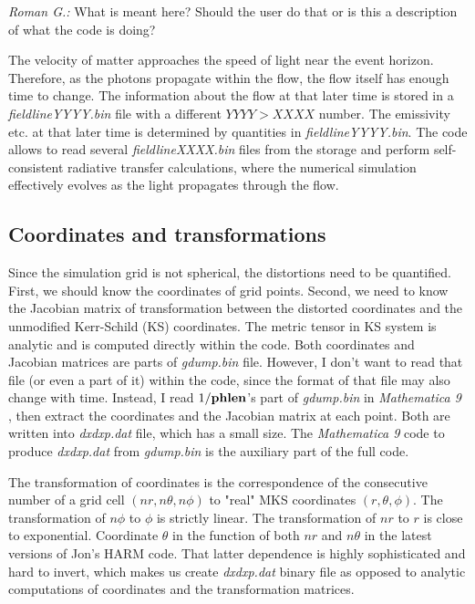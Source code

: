 \documentclass{emulateapj}
\newcommand{\mat}{\textit{Mathematica 9 }}
\newcommand{\rg}[1]{\color{blue}\textit{Roman G.:} #1\color{black}}
\begin{document}
\rg{What is meant here? Should the user do that or is this a
  description of what the code is doing?}

The velocity of matter approaches the speed of light near the event
horizon. Therefore, as the photons propagate within the flow, the flow
itself has enough time to change.  The information about the flow at
that later time is stored in a \textit{fieldlineYYYY.bin} file with a
different $YYYY>XXXX$ number. The emissivity etc.  at that later time
is determined by quantities in \textit{fieldlineYYYY.bin}. The code
allows to read several \textit{fieldlineXXXX.bin} files from the
storage and perform self-consistent radiative transfer calculations,
where the numerical simulation effectively evolves as the light
propagates through the flow.

\subsection{Coordinates and transformations}
Since the simulation grid is not spherical, the distortions need to be quantified.
First, we should know the coordinates of grid points. Second, we need to know the Jacobian matrix of transformation between the distorted coordinates and
the unmodified Kerr-Schild (KS) coordinates. The metric tensor in KS system is analytic and is computed directly within the code.
Both coordinates and Jacobian matrices are parts of \textit{gdump.bin} file. However, I don't want to read that file (or even a part of it) within the code,
since the format of that file may also change with time. Instead, I read $1/{\bf phlen}$'s part of \textit{gdump.bin} in \mat, 
then extract the coordinates and the Jacobian matrix at each point. Both are written into \textit{dxdxp.dat} file, which has a small size.
The \mat code to produce \textit{dxdxp.dat} from \textit{gdump.bin} is the auxiliary part of the full code.

The transformation of coordinates is the correspondence of the consecutive number of a grid cell $(nr,n\theta,n\phi)$ to "real" MKS coordinates $(r,\theta,\phi)$.
The transformation of $n\phi$ to $\phi$ is strictly linear. The transformation of $nr$ to $r$ is close to exponential.
Coordinate $\theta$ in the function of both $nr$ and $n\theta$ in the latest versions of Jon's HARM code.
That latter dependence is highly sophisticated and hard to invert, which makes us create \textit{dxdxp.dat} binary file as opposed to analytic computations of coordinates
and the transformation matrices.
\end{document}
